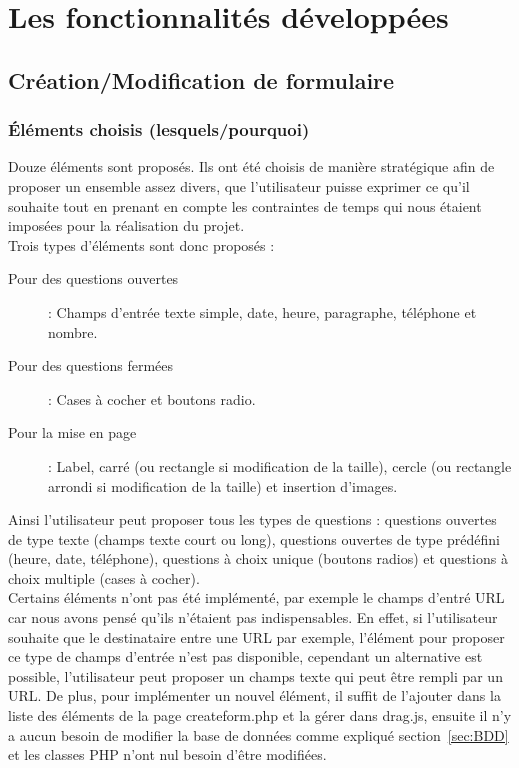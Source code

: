 \documentclass{sigplanconf}
\begin{document}
\section{Les fonctionnalités développées}
\subsection{Création/Modification de formulaire}
\subsubsection{Éléments choisis (lesquels/pourquoi)}
Douze éléments sont proposés. Ils ont été choisis de manière stratégique afin de proposer un ensemble assez divers, que l’utilisateur puisse exprimer ce qu’il souhaite tout en prenant en compte les contraintes de temps qui nous étaient imposées pour la réalisation du projet.\\
Trois types d'éléments sont donc proposés :
\begin{description}
\item [Pour des questions ouvertes] : Champs d'entrée texte simple, date, heure, paragraphe, téléphone et nombre.
\item [Pour des questions fermées] : Cases à cocher et boutons radio.
\item [Pour la mise en page] : Label, carré (ou rectangle si modification de la taille), cercle (ou rectangle arrondi si modification de la taille) et insertion d'images.
\end{description}
Ainsi l’utilisateur peut proposer tous les types de questions : questions ouvertes de type texte (champs texte court ou long), questions ouvertes de type prédéfini (heure, date, téléphone), questions à choix unique (boutons radios) et questions à choix multiple (cases à cocher).\\
Certains éléments n'ont pas été implémenté, par exemple le champs d'entré URL car nous avons pensé qu'ils n'étaient pas indispensables. En effet, si l'utilisateur souhaite que le destinataire entre une URL par exemple, l'élément pour proposer ce type de champs d'entrée n'est pas disponible, cependant un alternative est possible, l'utilisateur peut proposer un champs texte qui peut être rempli par un URL. De plus, pour implémenter un nouvel élément, il suffit de l'ajouter dans la liste des éléments de la page createform.php et la gérer dans drag.js, ensuite il n'y a aucun besoin de modifier la base de données comme expliqué section~\ref{sec:BDD} et les classes PHP n'ont nul besoin d'être modifiées.
\end{document}
